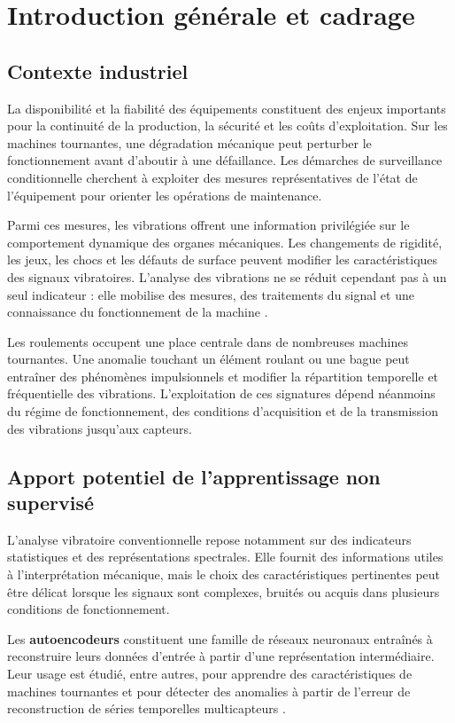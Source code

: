 \chapter{Introduction générale et cadrage}
\label{chap:introduction}

\section{Contexte industriel}
La disponibilité et la fiabilité des équipements constituent des enjeux importants pour la continuité de la production, la sécurité et les coûts d'exploitation. Sur les machines tournantes, une dégradation mécanique peut perturber le fonctionnement avant d'aboutir à une défaillance. Les démarches de surveillance conditionnelle cherchent à exploiter des mesures représentatives de l'état de l'équipement pour orienter les opérations de maintenance.

Parmi ces mesures, les vibrations offrent une information privilégiée sur le comportement dynamique des organes mécaniques. Les changements de rigidité, les jeux, les chocs et les défauts de surface peuvent modifier les caractéristiques des signaux vibratoires. L'analyse des vibrations ne se réduit cependant pas à un seul indicateur : elle mobilise des mesures, des traitements du signal et une connaissance du fonctionnement de la machine \cite{boulenger2009}.

Les roulements occupent une place centrale dans de nombreuses machines tournantes. Une anomalie touchant un élément roulant ou une bague peut entraîner des phénomènes impulsionnels et modifier la répartition temporelle et fréquentielle des vibrations. L'exploitation de ces signatures dépend néanmoins du régime de fonctionnement, des conditions d'acquisition et de la transmission des vibrations jusqu'aux capteurs.

\section{Apport potentiel de l'apprentissage non supervisé}
L'analyse vibratoire conventionnelle repose notamment sur des indicateurs statistiques et des représentations spectrales. Elle fournit des informations utiles à l'interprétation mécanique, mais le choix des caractéristiques pertinentes peut être délicat lorsque les signaux sont complexes, bruités ou acquis dans plusieurs conditions de fonctionnement.

Les \textbf{autoencodeurs} constituent une famille de réseaux neuronaux entraînés à reconstruire leurs données d'entrée à partir d'une représentation intermédiaire. Leur usage est étudié, entre autres, pour apprendre des caractéristiques de machines tournantes \cite{shao2017} et pour détecter des anomalies à partir de l'erreur de reconstruction de séries temporelles multicapteurs \cite{malhotra2016}.

